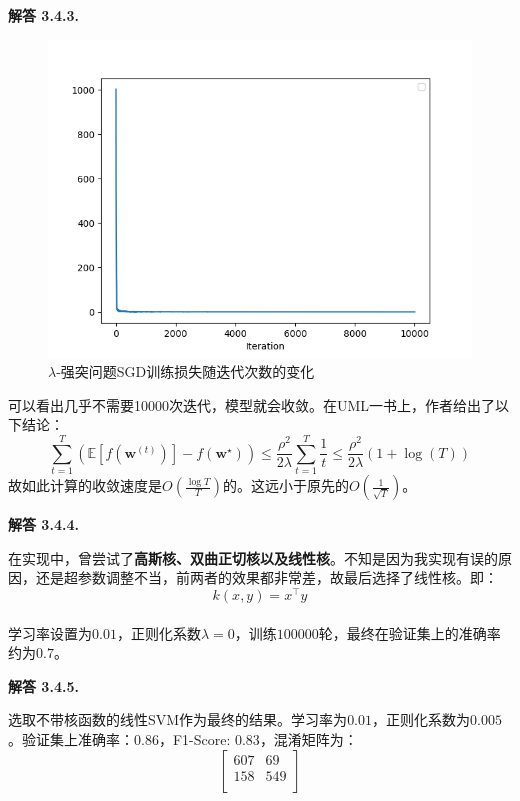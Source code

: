 \documentclass[12pt, a4paper, oneside]{ctexart}
\newenvironment{solution}[1]{\par\noindent\textbf{解答 #1. }\par}{\par}
\begin{document}
\begin{solution}{3.4.3}
    \begin{figure}
        \centering
        \caption{$\lambda$-强突问题SGD训练损失随迭代次数的变化}
        \includegraphics[width=.7\textwidth]{pic/Figure_9.png}
    \end{figure}
    可以看出几乎不需要10000次迭代，模型就会收敛。在UML一书上，作者给出了以下结论：
    \begin{equation}
        \sum_{t=1}^T(\mathbb{E}[f(\mathbf{w}^{(t)})]-f(\mathbf{w}^\star))\leq\frac{\rho^2}{2\lambda}\sum_{t=1}^T\frac{1}{t}\leq\frac{\rho^2}{2\lambda}(1+\log(T)) \nonumber
    \end{equation}
    故如此计算的收敛速度是$O(\frac{\log T}{T})$的。这远小于原先的$O(\frac{1}{\sqrt T})$。
\end{solution}

\begin{solution}{3.4.4}
    在实现中，曾尝试了\textbf{高斯核、双曲正切核以及线性核}。不知是因为我实现有误的原因，还是超参数调整不当，前两者的效果都非常差，故最后选择了线性核。即：
    \begin{equation}
        k(x, y) = x^\top y \nonumber
    \end{equation}
    \\
    学习率设置为$0.01$，正则化系数$\lambda = 0$，训练$100000$轮，最终在验证集上的准确率约为$0.7$。
\end{solution}


\begin{solution}{3.4.5}
    选取不带核函数的线性SVM作为最终的结果。学习率为$0.01$，正则化系数为$0.005$。验证集上准确率：$0.86$，F1-Score: $0.83$，混淆矩阵为：
    $$
    \begin{bmatrix}
        607 & 69 \\
        158 & 549 \\
    \end{bmatrix}
    $$
\end{solution}
\end{document}
